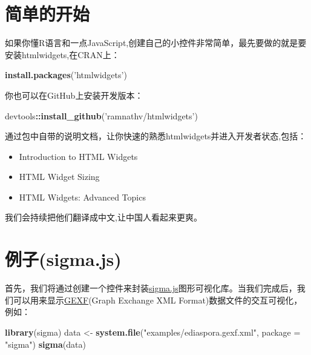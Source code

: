 \documentclass[]{book}
\newenvironment{Shaded}{\begin{snugshade}}{\end{snugshade}}
\newcommand{\KeywordTok}[1]{\textcolor[rgb]{0.13,0.29,0.53}{\textbf{#1}}}
\newcommand{\DataTypeTok}[1]{\textcolor[rgb]{0.13,0.29,0.53}{#1}}
\newcommand{\StringTok}[1]{\textcolor[rgb]{0.31,0.60,0.02}{#1}}
\newcommand{\OperatorTok}[1]{\textcolor[rgb]{0.81,0.36,0.00}{\textbf{#1}}}
\newcommand{\NormalTok}[1]{#1}
\theoremstyle{definition}
\theoremstyle{definition}
\theoremstyle{definition}
\theoremstyle{remark}
\begin{document}
\section{简单的开始}

如果你懂R语言和一点JavaScript,创建自己的小控件非常简单，最先要做的就是要安装htmlwidgets,在CRAN上：

\begin{Shaded}
\begin{Highlighting}[]
\KeywordTok{install.packages}\NormalTok{(}\StringTok{'htmlwidgets'}\NormalTok{)}
\end{Highlighting}
\end{Shaded}

你也可以在GitHub上安装开发版本：

\begin{Shaded}
\begin{Highlighting}[]
\NormalTok{devtools}\OperatorTok{::}\KeywordTok{install_github}\NormalTok{(}\StringTok{'ramnathv/htmlwidgets'}\NormalTok{)}
\end{Highlighting}
\end{Shaded}

通过包中自带的说明文档，让你快速的熟悉htmlwidgets并进入开发者状态,包括：

\begin{itemize}
\item
  Introduction to HTML Widgets
\item
  HTML Widget Sizing
\item
  HTML Widgets: Advanced Topics
\end{itemize}

我们会持续把他们翻译成中文,让中国人看起来更爽。

\section{例子(sigma.js)}\label{sigma.js}

首先，我们将通过创建一个控件来封装\href{http://sigmajs.org/}{sigma.js}图形可视化库。当我们完成后，我们可以用来显示\href{https://gephi.org/gexf/format/}{GEXF}(Graph
Exchange XML Format)数据文件的交互可视化，例如：

\begin{Shaded}
\begin{Highlighting}[]
\KeywordTok{library}\NormalTok{(sigma)}
\NormalTok{data <-}\StringTok{ }\KeywordTok{system.file}\NormalTok{(}\StringTok{"examples/ediaspora.gexf.xml"}\NormalTok{, }\DataTypeTok{package =} \StringTok{"sigma"}\NormalTok{)}
\KeywordTok{sigma}\NormalTok{(data)}
\end{Highlighting}
\end{Shaded}
\end{document}
